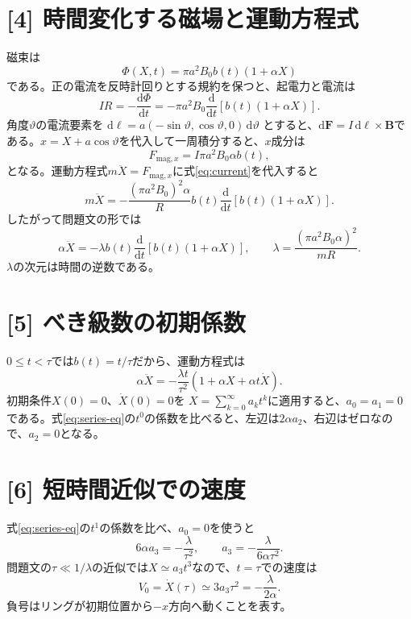 \documentclass[11pt,a4paper]{article}
\begin{document}
\section*{[4] 時間変化する磁場と運動方程式}
磁束は
\begin{equation}
  \Phi(X,t)=\pi a^2B_0b(t)(1+\alpha X)
\end{equation}
である。正の電流を反時計回りとする規約を保つと、起電力と電流は
\begin{equation}
  IR=-\frac{\mathrm d\Phi}{\mathrm dt}
  =-\pi a^2B_0\frac{\mathrm d}{\mathrm dt}[b(t)(1+\alpha X)].
  \label{eq:current}
\end{equation}
角度$\vartheta$の電流要素を
$\mathrm d\boldsymbol\ell=a(-\sin\vartheta,\cos\vartheta,0)\,\mathrm d\vartheta$
とすると、$\mathrm d\boldsymbol F=I\,\mathrm d\boldsymbol\ell\times\boldsymbol B$である。$x=X+a\cos\vartheta$を代入して一周積分すると、$x$成分は
\begin{equation}
  F_{\mathrm{mag},x}=I\pi a^2B_0\alpha b(t),
\end{equation}
となる。運動方程式$m\ddot X=F_{\mathrm{mag},x}$に式\eqref{eq:current}を代入すると
\begin{equation}
  m\ddot X=-\frac{(\pi a^2B_0)^2\alpha}{R}
  b(t)\frac{\mathrm d}{\mathrm dt}[b(t)(1+\alpha X)].
\end{equation}
したがって問題文の形では
\begin{equation}
  \boxed{\alpha\ddot X=-\lambda b(t)\frac{\mathrm d}{\mathrm dt}[b(t)(1+\alpha X)]},
  \qquad
  \boxed{\lambda=\frac{(\pi a^2B_0\alpha)^2}{mR}}.
\end{equation}
$\lambda$の次元は時間の逆数である。

\section*{[5] べき級数の初期係数}
$0\le t<\tau$では$b(t)=t/\tau$だから、運動方程式は
\begin{equation}
  \alpha\ddot X=-\frac{\lambda t}{\tau^2}
  \left(1+\alpha X+\alpha t\dot X\right).
  \label{eq:series-eq}
\end{equation}
初期条件$X(0)=0$、$\dot X(0)=0$を
$X=\sum_{k=0}^{\infty}a_kt^k$に適用すると、$a_0=a_1=0$である。式\eqref{eq:series-eq}の$t^0$の係数を比べると、左辺は$2\alpha a_2$、右辺はゼロなので、$a_2=0$となる。

\section*{[6] 短時間近似での速度}
式\eqref{eq:series-eq}の$t^1$の係数を比べ、$a_0=0$を使うと
\begin{equation}
  6\alpha a_3=-\frac{\lambda}{\tau^2},
  \qquad
  \boxed{a_3=-\frac{\lambda}{6\alpha\tau^2}}.
\end{equation}
問題文の$\tau\ll1/\lambda$の近似では$X\simeq a_3t^3$なので、$t=\tau$での速度は
\begin{equation}
  \boxed{V_0=\dot X(\tau)\simeq3a_3\tau^2=-\frac{\lambda}{2\alpha}}.
\end{equation}
負号はリングが初期位置から$-x$方向へ動くことを表す。
\end{document}
